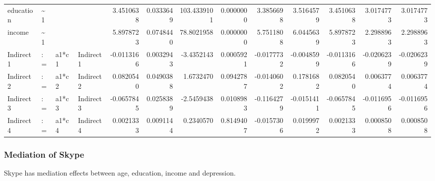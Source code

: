 \documentclass[
]{article}
\begin{document}
\begin{table}[!h]
\begin{tabular}[t]{llllrrrrrrrrr}
\addlinespace
education & \textasciitilde{}1 &  &  & 3.4510638 & 0.0333649 & 103.4339101 & 0.0000000 & 3.3856698 & 3.5164579 & 3.4510638 & 3.0174773 & 3.0174773\\
income & \textasciitilde{}1 &  &  & 5.8978723 & 0.0748440 & 78.8021958 & 0.0000000 & 5.7511808 & 6.0445639 & 5.8978723 & 2.2988963 & 2.2988963\\
Indirect1 & := & a1*c1 & Indirect1 & -0.0113166 & 0.0032943 & -3.4352143 & 0.0005921 & -0.0177732 & -0.0048599 & -0.0113166 & -0.0206239 & -0.0206239\\
Indirect2 & := & a1*c2 & Indirect2 & 0.0820540 & 0.0490388 & 1.6732470 & 0.0942787 & -0.0140602 & 0.1781682 & 0.0820540 & 0.0063774 & 0.0063774\\
Indirect3 & := & a1*c3 & Indirect3 & -0.0657845 & 0.0258389 & -2.5459438 & 0.0108983 & -0.1164279 & -0.0151411 & -0.0657845 & -0.0116956 & -0.0116956\\
\addlinespace
Indirect4 & := & a1*c4 & Indirect4 & 0.0021333 & 0.0091144 & 0.2340570 & 0.8149407 & -0.0157306 & 0.0199972 & 0.0021333 & 0.0008508 & 0.0008508\\
\bottomrule
\end{tabular}
\end{table}

\newpage

\hypertarget{mediation-of-skype}{%
\subsubsection{Mediation of Skype}\label{mediation-of-skype}}

Skype has mediation effects between age, education, income and
depression.
\end{document}
